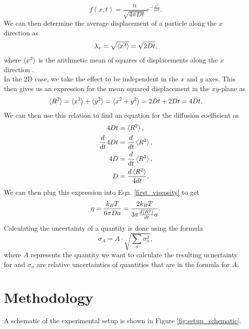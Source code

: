 \documentclass[twocolumn,a4paper,aps,amsmath,amssymb,floatfix,superscriptaddress]{revtex4-2}
\begin{document}
    \begin{equation}
        f(x, t) = \frac{n}{\sqrt{4\pi Dt}}e^{-\frac{x^2}{4Dt}}.
    \end{equation}
    We can then determine the average displacement of a particle along the $x$ direction as
    \begin{equation}
        \lambda_x = \sqrt{\braket{x^2}} = \sqrt{2Dt},
    \end{equation}
    where $\braket{x^2}$ is the arithmetic mean of squares of displacements along the $x$ direction \cite{einstein1905}.\\
    In the 2D case, we take the effect to be independent in the $x$ and $y$ axes. This then gives us an expression for the mean squared displacement in the $xy$-plane as
    \begin{equation}
        \braket{R^2} = \braket{x^2} + \braket{y^2} = \braket{x^2 + y^2} = 2Dt + 2Dt = 4Dt.
    \end{equation}
    We can then use this relation to find an equation for the diffusion coefficient as
    \begin{align}
        4Dt &= \braket{R^2},\\
        \frac{d}{dt}4Dt &= \frac{d}{dt}\braket{R^2},\\
        4D &= \frac{d}{dt}\braket{R^2},\\
        D &= \frac{d\braket{R^2}}{4dt}. \label{diff_coef}
    \end{align}
    We can then plug this expression into Eqn. \ref{first_viscosity} to get
    \begin{equation}
        \eta = \frac{k_BT}{6\pi Da} = \frac{2k_BT}{3\pi \frac{d\braket{R^2}}{dt} a}. \label{viscosity}
    \end{equation}
    Calculating the uncertainty of a quantity is done using the formula
    \begin{equation}
        \sigma_A = A \cdot \sqrt{\sum_n \sigma_n^2}, \label{uncertainty}
    \end{equation}
    where $A$ represents the quantity we want to calculate the resulting ucnertainty for and $\sigma_n$ are relative uncertainties of quantities that are in the formula for $A$.

\section{Methodology}
    A schematic of the experimental setup is shown in Figure \ref{fig:setup_schematic}. 
\end{document}

